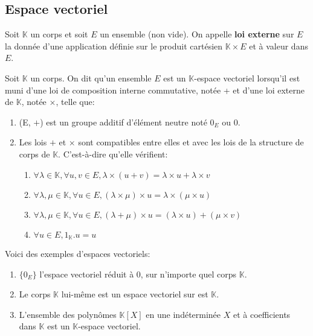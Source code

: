 \subsection{Espace vectoriel}
\begin{madefinition}
	Soit $\mathbb{K}$ un corps et soit $E$ un ensemble (non vide). On appelle \textbf{loi externe} sur $E$ la donnée d'une application définie sur le produit cartésien $\mathbb{K} \times E$ et à valeur dans $E$.
\end{madefinition}
\begin{madefinition}
	Soit $\mathbb{K}$ un corps. On dit qu’un ensemble $E$ est un $\mathbb{K}$-espace vectoriel lorsqu’il est muni d’une loi de composition interne commutative, notée + et d’une loi externe de $\mathbb{K}$, notée $\times$, telle que:
	\begin{enumerate}
		\item (E, $+$) est un groupe additif d'élément neutre noté $0_E$ ou $0$.
		\item Les lois $+$ et $\times$ sont compatibles entre elles et avec les lois de la structure de corps de $\mathbb{K}$. C'est-à-dire qu'elle vérifient:
		\begin{enumerate}
			\item  $\forall \lambda \in \mathbb{K}, \forall u,v \in E, \lambda \times (u+v) = \lambda \times u + \lambda \times v$
			\item $\forall \lambda , \mu \in \mathbb{K}, \forall u \in E, (\lambda \times \mu)\times u 
			= \lambda \times(\mu \times u) $
			\item $\forall \lambda, \mu \in \mathbb{K}, \forall u \in E, (\lambda + \mu)\times u = (\lambda \times u) + (\mu \times v)$
			\item  $\forall u \in E, 1_{\mathbb{K}}.u=u$
		\end{enumerate}
	\end{enumerate}	
\end{madefinition}
\begin{monexemple}
	Voici des exemples d'espaces vectoriels:
	\begin{enumerate}
		\item $\{0_E\}$ l'espace vectoriel réduit à $0$, sur n’importe quel corps $\mathbb{K}$. 
		\item Le corps $\mathbb{K}$ lui-même est un espace vectoriel sur est $\mathbb{K}$.
		\item  L'ensemble des polynômes $\mathbb{K}[X]$ en une indéterminée $X$ et à coefficients dans $\mathbb{K}$ est un $\mathbb{K}$-espace vectoriel.
	\end{enumerate}
\end{monexemple}
